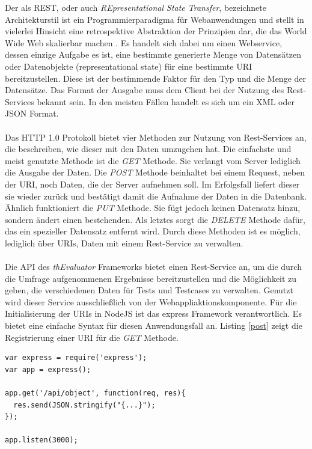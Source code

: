 Der als REST, oder auch \textit{\glqq REpresentational State Transfer\grqq{}}, bezeichnete Architekturstil ist ein Programmierparadigma für Webanwendungen und stellt in vielerlei Hinsicht eine retrospektive Abstraktion der Prinzipien dar, die das World Wide Web skalierbar machen \cite{rest}. Es handelt sich dabei um einen Webservice, dessen einzige Aufgabe es ist, eine bestimmte generierte Menge von Datensätzen oder Datenobjekte (representational state) für eine bestimmte \Gls{URI} bereitzustellen. Diese ist der bestimmende Faktor für den Typ und die Menge der Datensätze. Das Format der Ausgabe muss dem Client bei der Nutzung des Rest-Services bekannt sein. In den meisten Fällen handelt es sich um ein XML oder JSON Format.\\
\\
Das HTTP 1.0 Protokoll bietet vier Methoden zur Nutzung von Rest-Services an, die beschreiben, wie dieser mit den Daten umzugehen hat. Die einfachste und meist genutzte Methode ist die \textit{GET} Methode. Sie verlangt vom Server lediglich die Ausgabe der Daten. Die \textit{POST} Methode beinhaltet bei einem Request, neben der \Gls{URI}, noch Daten, die der Server aufnehmen soll. Im Erfolgsfall liefert dieser sie wieder zurück und bestätigt damit die Aufnahme der Daten in die Datenbank. Ähnlich funktioniert die \textit{PUT} Methode. Sie fügt jedoch keinen Datensatz hinzu, sondern ändert einen bestehenden. Als letztes sorgt die \textit{DELETE} Methode dafür, das ein spezieller Datensatz entfernt wird. Durch diese Methoden ist es möglich, lediglich über \Gls{URI}s, Daten mit einem Rest-Service zu verwalten.\\
\\
Die API des \textit{thEvaluator} Frameworks bietet einen Rest-Service an, um die durch die Umfrage aufgenommenen Ergebnisse bereitzustellen und die Möglichkeit zu geben, die verschiedenen Daten für Tests und Testcases zu verwalten. Genutzt wird dieser Service ausschließlich von der Webappliaktionskomponente. Für die Initialisierung der \Gls{URI}s in NodeJS ist das express Framework verantwortlich. Es bietet eine einfache Syntax für diesen Anwendungsfall an. Listing \ref{post} zeigt die Registrierung einer \Gls{URI} für die \textit{GET} Methode.

\vspace{1cm}
\begin{lstlisting}[caption=Registrierung einer URI für die \textit{GET} Methode,label=post]
var express = require('express');
var app = express();

app.get('/api/object', function(req, res){
  res.send(JSON.stringify("{...}");
});

app.listen(3000);
\end{lstlisting}
\vspace{0.6cm}

